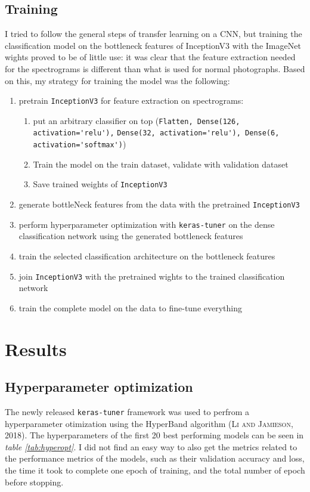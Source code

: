 \documentclass{article}
\begin{document}
\subsection{Training}
I tried to follow the general steps of transfer learning on a CNN, but training the classification model on the bottleneck features of InceptionV3 with the ImageNet wights proved to be of little use: it was clear that the feature extraction needed for the spectrograms is different than what is used for normal photographs. Based on this, my strategy for training the model was the following:

\begin{enumerate}
  \item pretrain \verb+InceptionV3+ for feature extraction on spectrograms:
  \begin{enumerate} 
    \item put an arbitrary classifier on top (\verb+Flatten, Dense(126, activation='relu'),+ \verb+Dense(32, activation='relu'), Dense(6, activation='softmax')+)
    \item Train the model on the train dataset, validate with validation dataset
    \item Save trained weights of \verb+InceptionV3+
  \end{enumerate}
  \item generate bottleNeck features from the data with the pretrained \verb+InceptionV3+
  \item perform hyperparameter optimization with \verb+keras-tuner+ on the dense classification network using the generated bottleneck features
  \item train the selected classification architecture on the bottleneck features
  \item join \verb+InceptionV3+ with the pretrained wights to the trained classification network
  \item train the complete model on the data to fine-tune everything
\end{enumerate}

\section{Results}
\subsection{Hyperparameter optimization}

The newly released \verb+keras-tuner+ framework was used to perfrom a hyperparameter otimization using the HyperBand algorithm (\textsc{Li and Jamieson, 2018}). The hyperparameters of the first 20 best performing models can be seen in \textit{table \ref{tab:hyperopt}}. I did not find an easy way to also get the metrics related to the performance metrics of the models, such as their validation accuracy and loss, the time it took to complete one epoch of training, and the total number of epoch before stopping.
\end{document}
